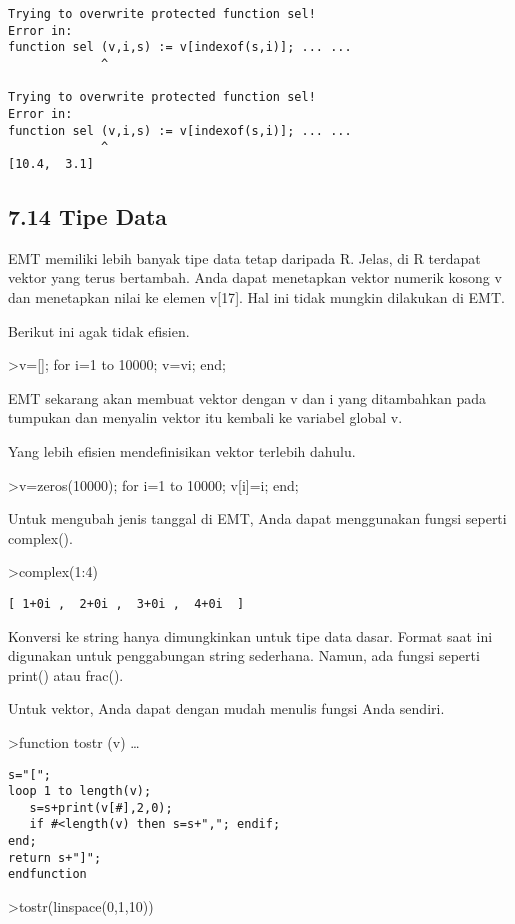 \documentclass[
]{book}
\begin{document}
\begin{verbatim}
Trying to overwrite protected function sel!
Error in:
function sel (v,i,s) := v[indexof(s,i)]; ... ...
             ^

Trying to overwrite protected function sel!
Error in:
function sel (v,i,s) := v[indexof(s,i)]; ... ...
             ^
[10.4,  3.1]
\end{verbatim}

\subsection{7.14 Tipe Data}\label{tipe-data}

EMT memiliki lebih banyak tipe data tetap daripada R. Jelas, di R terdapat vektor yang terus bertambah. Anda dapat menetapkan vektor numerik kosong v dan menetapkan nilai ke elemen v{[}17{]}. Hal ini tidak mungkin dilakukan di EMT.

Berikut ini agak tidak efisien.

\textgreater v={[}{]}; for i=1 to 10000; v=v\textbar i; end;

EMT sekarang akan membuat vektor dengan v dan i yang ditambahkan pada tumpukan dan menyalin vektor itu kembali ke variabel global v.

Yang lebih efisien mendefinisikan vektor terlebih dahulu.

\textgreater v=zeros(10000); for i=1 to 10000; v{[}i{]}=i; end;

Untuk mengubah jenis tanggal di EMT, Anda dapat menggunakan fungsi seperti complex().

\textgreater complex(1:4)

\begin{verbatim}
[ 1+0i ,  2+0i ,  3+0i ,  4+0i  ]
\end{verbatim}

Konversi ke string hanya dimungkinkan untuk tipe data dasar. Format saat ini digunakan untuk penggabungan string sederhana. Namun, ada fungsi seperti print() atau frac().

Untuk vektor, Anda dapat dengan mudah menulis fungsi Anda sendiri.

\textgreater function tostr (v) \ldots{}

\begin{verbatim}
s="[";
loop 1 to length(v);
   s=s+print(v[#],2,0);
   if #<length(v) then s=s+","; endif;
end;
return s+"]";
endfunction
\end{verbatim}

\textgreater tostr(linspace(0,1,10))
\end{document}
